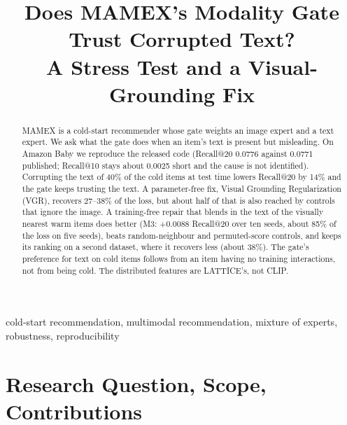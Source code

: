 \documentclass[conference]{IEEEtran}
\begin{document}
\title{Does MAMEX's Modality Gate Trust Corrupted Text?\\
A Stress Test and a Visual-Grounding Fix}

\author{
}

\maketitle

\begin{abstract}
MAMEX is a cold-start recommender whose gate weights an image expert and a text expert. We ask what the gate does when an item's text is present but misleading. On Amazon Baby we reproduce the released code (Recall@20 0.0776 against 0.0771 published; Recall@10 stays about 0.0025 short and the cause is not identified). Corrupting the text of 40\% of the cold items at test time lowers Recall@20 by 14\% and the gate keeps trusting the text. A parameter-free fix, Visual Grounding Regularization (VGR), recovers 27--38\% of the loss, but about half of that is also reached by controls that ignore the image. A training-free repair that blends in the text of the visually nearest warm items does better (M3: +0.0088 Recall@20 over ten seeds, about 85\% of the loss on five seeds), beats random-neighbour and permuted-score controls, and keeps its ranking on a second dataset, where it recovers less (about 38\%). The gate's preference for text on cold items follows from an item having no training interactions, not from being cold. The distributed features are LATTICE's, not CLIP.
\end{abstract}

\begin{IEEEkeywords}
cold-start recommendation, multimodal recommendation, mixture of experts, robustness, reproducibility
\end{IEEEkeywords}

\section{Research Question, Scope, Contributions}
\end{document}
